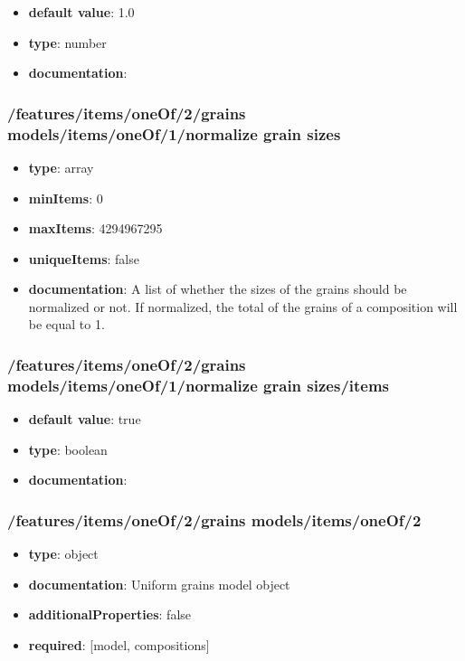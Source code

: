 \begin{itemize}\item {\bf default value}: 1.0
\item {\bf type}: number
\item {\bf documentation}: 
\end{itemize}\subsubsection{/features/items/oneOf/2/grains models/items/oneOf/1/normalize grain sizes}
\begin{itemize}\item {\bf type}: array
\item {\bf minItems}: 0
\item {\bf maxItems}: 4294967295
\item {\bf uniqueItems}: false
\item {\bf documentation}: A list of whether the sizes of the grains should be normalized or not. If normalized, the total of the grains of a composition will be equal to 1.
\end{itemize}\subsubsection{/features/items/oneOf/2/grains models/items/oneOf/1/normalize grain sizes/items}
\begin{itemize}\item {\bf default value}: true
\item {\bf type}: boolean
\item {\bf documentation}: 
\end{itemize}\subsubsection{/features/items/oneOf/2/grains models/items/oneOf/2}
\begin{itemize}\item {\bf type}: object
\item {\bf documentation}: Uniform grains model object
\item {\bf additionalProperties}: false
\item {\bf required}: [model, compositions]\end{itemize}
